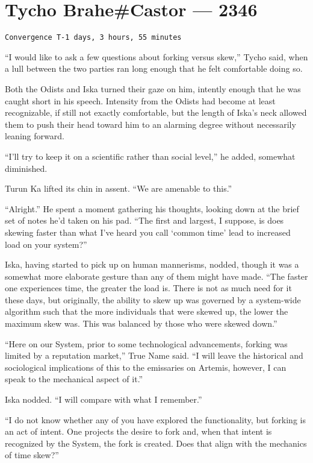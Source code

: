 \hypertarget{tycho-brahecastor-2346}{%
\chapter{Tycho Brahe\#Castor — 2346}\label{tycho-brahecastor-2346}}

\begin{verbatim}
Convergence T-1 days, 3 hours, 55 minutes
\end{verbatim}

``I would like to ask a few questions about forking versus skew,'' Tycho said, when a lull between the two parties ran long enough that he felt comfortable doing so.

Both the Odists and Iska turned their gaze on him, intently enough that he was caught short in his speech. Intensity from the Odists had become at least recognizable, if still not exactly comfortable, but the length of Iska's neck allowed them to push their head toward him to an alarming degree without necessarily leaning forward.

``I'll try to keep it on a scientific rather than social level,'' he added, somewhat diminished.

Turun Ka lifted its chin in assent. ``We are amenable to this.''

``Alright.'' He spent a moment gathering his thoughts, looking down at the brief set of notes he'd taken on his pad. ``The first and largest, I suppose, is does skewing faster than what I've heard you call `common time' lead to increased load on your system?''

Iska, having started to pick up on human mannerisms, nodded, though it was a somewhat more elaborate gesture than any of them might have made. ``The faster one experiences time, the greater the load is. There is not as much need for it these days, but originally, the ability to skew up was governed by a system-wide algorithm such that the more individuals that were skewed up, the lower the maximum skew was. This was balanced by those who were skewed down.''

``Here on our System, prior to some technological advancements, forking was limited by a reputation market,'' True Name said. ``I will leave the historical and sociological implications of this to the emissaries on Artemis, however, I can speak to the mechanical aspect of it.''

Iska nodded. ``I will compare with what I remember.''

``I do not know whether any of you have explored the functionality, but forking is an act of intent. One projects the desire to fork and, when that intent is recognized by the System, the fork is created. Does that align with the mechanics of time skew?''

